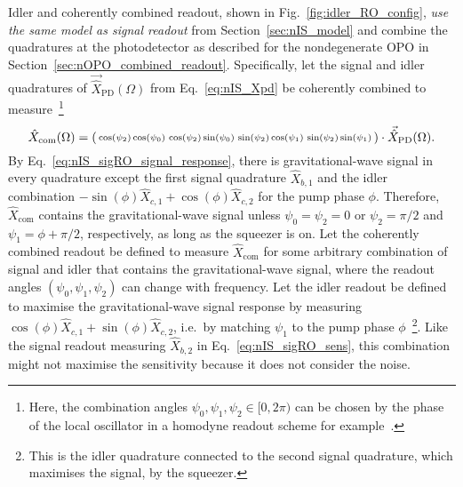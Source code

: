 Idler and coherently combined readout, shown in Fig.~\ref{fig:idler_RO_config}, \emph{use the same model as signal readout} from Section~\ref{sec:nIS_model} and combine the quadratures at the photodetector as described for the nondegenerate OPO in Section~\ref{sec:nOPO_combined_readout}. Specifically, let the signal and idler quadratures of $\vec{\hat X}_\text{PD}(\Omega)$ from Eq.~\ref{eq:nIS_Xpd} be coherently combined to measure~\footnote{Here, the combination angles $\psi_0,\psi_1,\psi_2\in[0,2\pi)$ can be chosen by the phase of the local oscillator in a homodyne readout scheme for example~\cite{danilishinQuantumMeasurementTheory2012}.}
\begin{equation}\label{eq:Xcom_three_angles}
\hat X_\text{com}(\Omega)=\begin{psmallmatrix}\cos(\psi_2)\cos(\psi_0) & \cos(\psi_2)\sin(\psi_0) & \sin(\psi_2)\cos(\psi_1) & \sin(\psi_2)\sin(\psi_1)\end{psmallmatrix}\cdot\vec{\hat X}_\text{PD}(\Omega).
\end{equation}
By Eq.~\ref{eq:nIS_sigRO_signal_response}, there is gravitational-wave signal in every quadrature except the first signal quadrature $\hat{X}_{b,1}$ and the idler combination $-\sin(\phi)\hat{X}_{c,1}+\cos(\phi)\hat{X}_{c,2}$ for the pump phase $\phi$. Therefore, $\hat{X}_\text{com}$ contains the gravitational-wave signal unless $\psi_0=\psi_2=0$ or $\psi_2=\pi/2$ and $\psi_1=\phi+\pi/2$, respectively, as long as the squeezer is on. 
Let the coherently combined readout be defined to measure $\hat{X}_\text{com}$ for some arbitrary combination of signal and idler that contains the gravitational-wave signal, where the readout angles $(\psi_0,\psi_1,\psi_2)$ can change with frequency.
Let the idler readout be defined to maximise the gravitational-wave signal response by measuring $\cos(\phi)\hat{X}_{c,1}+\sin(\phi)\hat{X}_{c,2}$, i.e.\ by matching $\psi_1$ to the pump phase $\phi$~\footnote{This is the idler quadrature connected to the second signal quadrature, which maximises the signal, by the squeezer.}. Like the signal readout measuring $\hat{X}_{b,2}$ in Eq.~\ref{eq:nIS_sigRO_sens}, this combination might not maximise the sensitivity because it does not consider the noise. %
